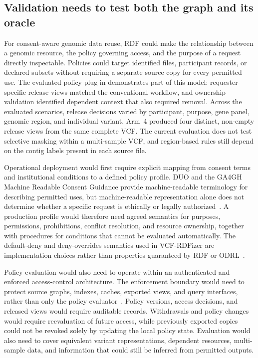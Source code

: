 \documentclass[pdflatex,sn-mathphys-num]{sn-jnl}
\begin{document}
\subsection{Validation needs to test both the graph and its oracle}\label{subsec:disc-validation}
For consent-aware genomic data reuse, RDF could make the relationship between a genomic resource, the policy governing access, and the purpose of a request directly inspectable.
Policies could target identified files, participant records, or declared subsets without requiring a separate source copy for every permitted use.
The evaluated policy plug-in demonstrates part of this model: requester-specific release views matched the conventional workflow, and ownership validation identified dependent context that also required removal.
Across the evaluated scenarios, release decisions varied by participant, purpose, gene panel, genomic region, and individual variant.
Arm~4 produced four distinct, non-empty release views from the same complete VCF.
The current evaluation does not test selective masking within a multi-sample VCF, and region-based rules still depend on the contig labels present in each source file.

Operational deployment would first require explicit mapping from consent terms and institutional conditions to a defined policy profile.
DUO and the GA4GH Machine Readable Consent Guidance provide machine-readable terminology for describing permitted uses, but machine-readable representation alone does not determine whether a specific request is ethically or legally authorized~\cite{lawson2021duo,ga4gh_mrcg,rehm2021ga4gh}.
A production profile would therefore need agreed semantics for purposes, permissions, prohibitions, conflict resolution, and resource ownership, together with procedures for conditions that cannot be evaluated automatically.
The default-deny and deny-overrides semantics used in VCF-RDFizer are implementation choices rather than properties guaranteed by RDF or ODRL~\cite{odrl_2018}.

Policy evaluation would also need to operate within an authenticated and enforced access-control architecture.
The enforcement boundary would need to protect source graphs, indexes, caches, exported views, and query interfaces, rather than only the policy evaluator~\cite{xacml3_2013,rehm2021ga4gh}.
Policy versions, access decisions, and released views would require auditable records.
Withdrawals and policy changes would require reevaluation of future access, while previously exported copies could not be revoked solely by updating the local policy state.
Evaluation would also need to cover equivalent variant representations, dependent resources, multi-sample data, and information that could still be inferred from permitted outputs.
\end{document}
